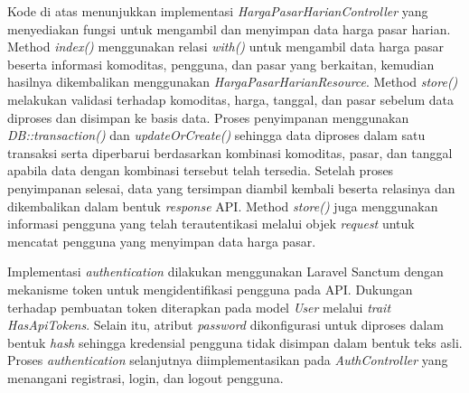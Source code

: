 Kode di atas menunjukkan implementasi \textit{HargaPasarHarianController} yang menyediakan fungsi untuk mengambil dan menyimpan data harga pasar harian. Method \textit{index()} menggunakan relasi \textit{with()} untuk mengambil data harga pasar beserta informasi komoditas, pengguna, dan pasar yang berkaitan, kemudian hasilnya dikembalikan menggunakan \textit{HargaPasarHarianResource}. Method \textit{store()} melakukan validasi terhadap komoditas, harga, tanggal, dan pasar sebelum data diproses dan disimpan ke basis data. Proses penyimpanan menggunakan \textit{DB::transaction()} dan \textit{updateOrCreate()} sehingga data diproses dalam satu transaksi serta diperbarui berdasarkan kombinasi komoditas, pasar, dan tanggal apabila data dengan kombinasi tersebut telah tersedia. Setelah proses penyimpanan selesai, data yang tersimpan diambil kembali beserta relasinya dan dikembalikan dalam bentuk \textit{response} API. Method \textit{store()} juga menggunakan informasi pengguna yang telah terautentikasi melalui objek \textit{request} untuk mencatat pengguna yang menyimpan data harga pasar.

Implementasi \textit{authentication} dilakukan menggunakan Laravel Sanctum dengan mekanisme token untuk mengidentifikasi pengguna pada API. Dukungan terhadap pembuatan token diterapkan pada model \textit{User} melalui \textit{trait HasApiTokens}. Selain itu, atribut \textit{password} dikonfigurasi untuk diproses dalam bentuk \textit{hash} sehingga kredensial pengguna tidak disimpan dalam bentuk teks asli. Proses \textit{authentication} selanjutnya diimplementasikan pada \textit{AuthController} yang menangani registrasi, login, dan logout pengguna.


